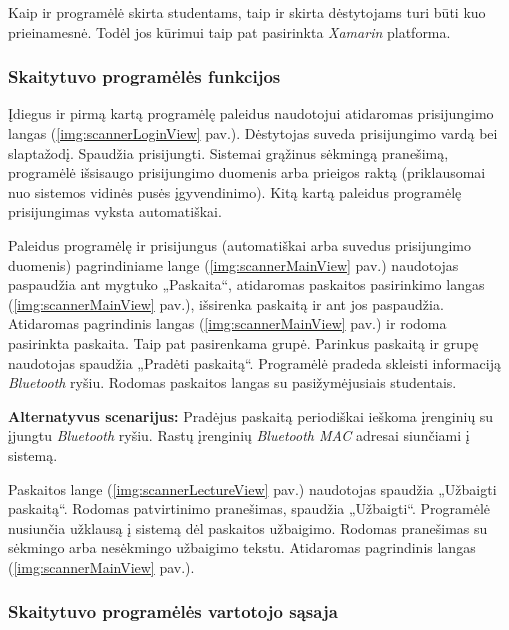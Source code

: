 \documentclass{VUMIFPSkursinis}
\begin{document}
Kaip ir programėlė skirta studentams, taip ir skirta dėstytojams turi būti kuo prieinamesnė. Todėl jos kūrimui taip pat pasirinkta \textit{Xamarin} platforma.

\subsubsection{Skaitytuvo programėlės funkcijos}


Įdiegus ir pirmą kartą programėlę paleidus naudotojui atidaromas prisijungimo langas (\ref{img:scannerLoginView} pav.). Dėstytojas suveda prisijungimo vardą bei slaptažodį. Spaudžia prisijungti. Sistemai grąžinus sėkmingą pranešimą, programėlė išsisaugo prisijungimo duomenis arba prieigos raktą (priklausomai nuo sistemos vidinės pusės įgyvendinimo). Kitą kartą paleidus programėlę prisijungimas vyksta automatiškai.


Paleidus programėlę ir prisijungus (automatiškai arba suvedus prisijungimo duomenis) pagrindiniame lange (\ref{img:scannerMainView} pav.) naudotojas paspaudžia ant mygtuko „Paskaita“, atidaromas paskaitos pasirinkimo langas (\ref{img:scannerMainView} pav.), išsirenka paskaitą ir ant jos paspaudžia. Atidaromas pagrindinis langas (\ref{img:scannerMainView} pav.) ir rodoma pasirinkta paskaita. Taip pat pasirenkama grupė. Parinkus paskaitą ir grupę naudotojas spaudžia „Pradėti paskaitą“. Programėlė pradeda skleisti informaciją \textit{Bluetooth} ryšiu. Rodomas paskaitos langas su pasižymėjusiais studentais.

\textbf{Alternatyvus scenarijus:} Pradėjus paskaitą periodiškai ieškoma įrenginių su įjungtu \textit{Bluetooth} ryšiu. Rastų įrenginių \textit{Bluetooth MAC} adresai siunčiami į sistemą.


Paskaitos lange (\ref{img:scannerLectureView} pav.) naudotojas spaudžia „Užbaigti paskaitą“. Rodomas patvirtinimo pranešimas, spaudžia „Užbaigti“. Programėlė nusiunčia užklausą į sistemą dėl paskaitos užbaigimo. Rodomas pranešimas su sėkmingo arba nesėkmingo užbaigimo tekstu. Atidaromas pagrindinis langas (\ref{img:scannerMainView} pav.).

\subsubsection{Skaitytuvo programėlės vartotojo sąsaja}
\end{document}
